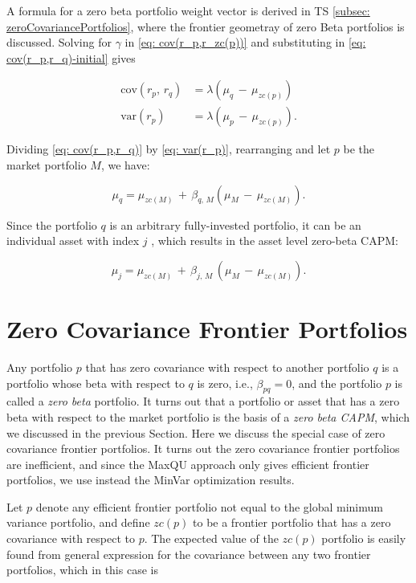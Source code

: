\documentclass[graybox,envcountchap,sectrefs]{svmono}\usepackage[]{graphicx}\usepackage[]{xcolor}
\begin{document}
\begin{appendices}
A formula for a zero beta portfolio weight vector is derived in TS
\ref{subsec: zeroCovariancePortfolios}, where the frontier geometray
of zero Beta portfolios is discussed. Solving for $\gamma$ in \eqref{eq: cov(r_p,r_zc(p))}
and substituting in \eqref{eq: cov(r_p,r_q)-initial} gives

\begin{align}
\mathrm{cov}(r_{p},\,r_{q}) & =\lambda(\mu_{q}\,-\,\mu_{zc(p)})\label{eq: cov(r_p,r_q)}\\
\mathrm{var}(r_{p}) & =\lambda(\mu_{p}\,-\,\mu_{zc(p)}).\label{eq: var(r_p)}
\end{align}

Dividing \eqref{eq: cov(r_p,r_q)} by \eqref{eq: var(r_p)}, rearranging
and let $p$ be the market portfolio $M$, we have: 

\begin{equation}
\mu_{q}=\mu_{zc(M)}\,+\,\beta_{q,\,M}(\mu_{M}\,-\,\mu_{zc(M)}).\label{eq: zeroBetaCAPMportLevel}
\end{equation}

Since the portfolio $q$ is an arbitrary fully-invested portfolio,
it can be an individual asset with index $j$ , which results in the
asset level zero-beta CAPM:

\begin{equation}
\mu_{j}=\mu_{zc(M)}\,+\,\beta_{j,\,M}\,(\mu_{M}\,-\,\mu_{zc(M)}).\label{eq: zeroBetaCAPM}
\end{equation}


\section{Zero Covariance Frontier Portfolios\label{subsec: zeroCovariancePortfolios}}

Any portfolio $p$ that has zero covariance with respect to another
portfolio $q$ is a portfolio whose beta with respect to $q$ is zero,
i.e., $\beta_{pq}=0$, and the portfolio $p$ is called a \emph{zero
beta} portfolio. It turns out that a portfolio or asset that has a
zero beta with respect to the market portfolio is the basis of a \emph{zero
beta CAPM}, which we discussed in the previous Section. Here we discuss
the special case of zero covariance frontier portfolios. It turns
out the zero covariance frontier portfolios are inefficient, and since
the MaxQU approach only gives efficient frontier portfolios, we use
instead the MinVar optimization results.

Let $p$ denote any efficient frontier portfolio not equal to the
global minimum variance portfolio, and define $zc(p)$ to be a frontier
portfolio that has a zero covariance with respect to $p$. The expected
value of the $zc(p)$ portfolio is easily found from general expression
\covTwoFrontierPortfolios for the covariance between any two frontier
portfolios, which in this case is


\end{appendices}
\end{document}
